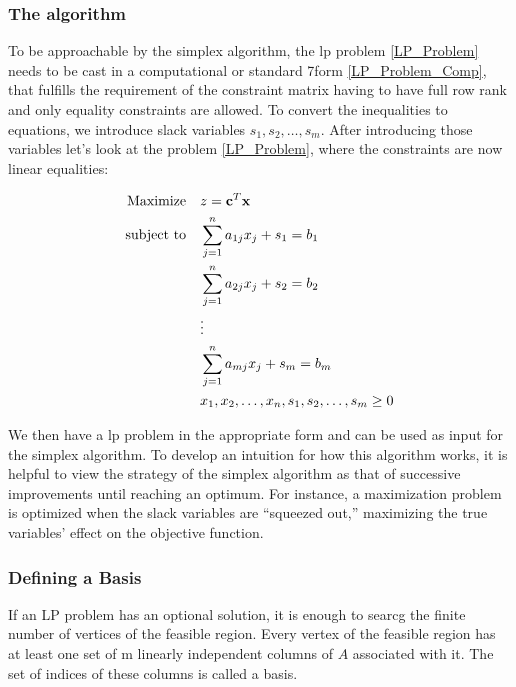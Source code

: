 \subsubsection{The algorithm}
To be approachable by the simplex algorithm, the \gls{lp} problem
\ref{LP_Problem} needs to be cast in a
computational or standard 7form \ref{LP_Problem_Comp}, that fulfills the requirement of the
constraint matrix having to have full row rank and only equality  constraints are allowed.
To convert the inequalities to equations, we introduce slack variables
\(s_1, s_2, \dots, s_m\). After introducing those variables
let's look at the problem \ref{LP_Problem}, where the constraints are now linear equalities:

\begin{align}
    \text{Maximize} \quad   & z = \mathbf{c}^T \mathbf{x} \notag                            \\
    \text{subject to} \quad & \sum_{j=1}^{n} a_{1j} x_j + s_1 = b_1 \notag                  \\
                            & \sum_{j=1}^{n} a_{2j} x_j + s_2 = b_2 \notag                  \\
                            & \vdots \notag                                                 \\
                            & \sum_{j=1}^{n} a_{mj} x_j + s_m = b_m \label{LP_Problem_Comp} \\
                            & x_1, x_2, \dots, x_n, s_1, s_2, \dots, s_m \geq 0 \notag
\end{align}

We then have a \gls{lp} problem in the appropriate form and can be used as input for
the simplex algorithm. To develop an intuition for how this algorithm works,
it is helpful to view the strategy of the simplex algorithm as that of
successive improvements until reaching an optimum. For instance, a maximization problem is optimized when the slack
variables are “squeezed out,” maximizing the true variables’ effect on the objective
function.

\subsubsection{Defining a Basis}
If an LP problem has an optional solution, it is enough to searcg the finite number
of vertices of the feasible region. Every vertex of the feasible region has at least
one set of m linearly independent columns of $A$ associated with it. The set of indices
of these columns is called a basis.

